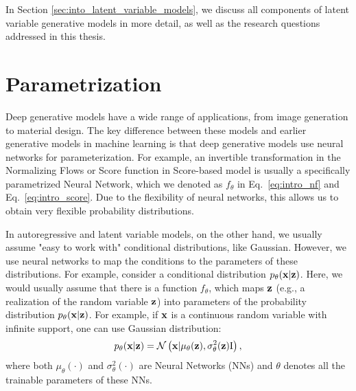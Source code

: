 In Section \ref{sec:into_latent_variable_models}, we discuss all components of latent variable generative models in more detail, as well as the research questions addressed in this thesis.




\section{Parametrization}\label{sec:intro_parametrization}
Deep generative models have a wide range of applications, from image generation to material design. The key difference between these models and earlier generative models in machine learning is that deep generative models use neural networks for parameterization. 
For example, an invertible transformation in the Normalizing Flows or Score function in Score-based model is usually a specifically parametrized Neural Network, which we denoted as $f_{\theta}$ in Eq.~\ref{eq:intro_nf} and Eq.~\ref{eq:intro_score}. Due to the flexibility of neural networks, this allows us to obtain very flexible probability distributions. 

In autoregressive and latent variable models, on the other hand, we usually assume "easy to work with" conditional distributions, like Gaussian. However, we use neural networks to map the conditions to the parameters of these distributions. 
For example, consider a conditional distribution $p_{\theta}({\mathbf{x}}|{\mathbf{z}})$. Here, we would usually assume that there is a function $f_{\theta}$, which maps ${\mathbf{z}}$ (e.g., a realization of the random variable ${\mathbf{z}}$) into parameters of the probability distribution $p_{\theta}({\mathbf{x}}|{\mathbf{z}})$. For example, if ${\mathbf{x}}$ is a continuous random variable with infinite support, one can use Gaussian distribution:
\begin{equation}
    p_{\theta}({\mathbf{x}}|{\mathbf{z}}) = \mathcal{N}\left({\mathbf{x}}| \mu_{\theta}({\mathbf{z}}), \sigma^2_{\theta}({\mathbf{z}}) \text{I}\right),
\end{equation}
where both $\mu_{\theta}(\cdot)$ and $\sigma^2_{\theta}(\cdot)$ are Neural Networks (NNs) and $\theta$ denotes all the trainable parameters of these NNs. 

